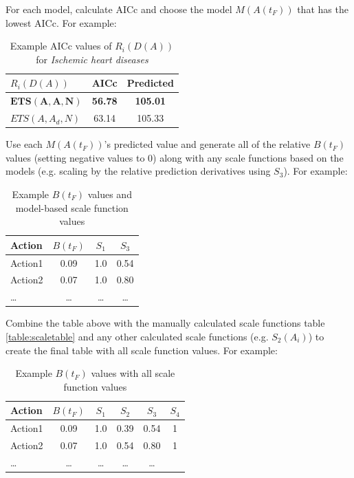 \documentclass[12pt, a4paper, twocolumn]{article}
\begin{document}
For each model, calculate AICc and choose the model $M(A(t_F))$ that has the lowest AICc. For example:

\begin{table}[H]
  \centering
  \begin{tabular}{lcc}
    \toprule
      $R_i(D(A))$       & AICc           & Predicted       \\
    \midrule
      $\bm{ETS(A,A,N)}$ & \textbf{56.78} & \textbf{105.01} \\
      $ETS(A,A_d,N)$    & 63.14          & 105.33          \\
    \bottomrule
  \end{tabular}
  \caption{Example AICc values of $R_i(D(A))$ for \textit{Ischemic heart diseases}}
  \label{table:choosem}
\end{table}

Use each $M(A(t_F))$'s predicted value and generate all of the relative $B(t_F)$ values (setting negative values to 0) along with any scale functions based on the models (e.g. scaling by the relative prediction derivatives using $S_3$). For example:

\begin{table}[H]
  \centering
  \begin{tabular}{lccc}
    \toprule
      Action  & $B(t_F)$ & $S_1$  & $S_3$  \\
    \midrule
      Action1 & 0.09     & 1.0    & 0.54   \\
      Action2 & 0.07     & 1.0    & 0.80   \\
      \ldots  & \ldots   & \ldots & \ldots \\
    \bottomrule
  \end{tabular}
  \caption{Example $B(t_F)$ values and model-based scale function values}
  \label{table:btable}
\end{table}

Combine the table above with the manually calculated scale functions table \ref{table:scaletable} and any other calculated scale functions (e.g. $S_2(A_i)$) to create the final table with all scale function values. For example:

\begin{table}[H]
  \centering
  \begin{tabular}{lccccc}
    \toprule
      Action  & $B(t_F)$ & $S_1$  & $S_2$  & $S_3$  & $S_4$  \\
    \midrule
      Action1 & 0.09     & 1.0    & 0.39   & 0.54   & 1      \\
      Action2 & 0.07     & 1.0    & 0.54   & 0.80   & 1      \\
      \ldots  & \ldots   & \ldots & \ldots & \ldots \\
    \bottomrule
  \end{tabular}
  \caption{Example $B(t_F)$ values with all scale function values}
  \label{table:btablewithall}
\end{table}
\end{document}

